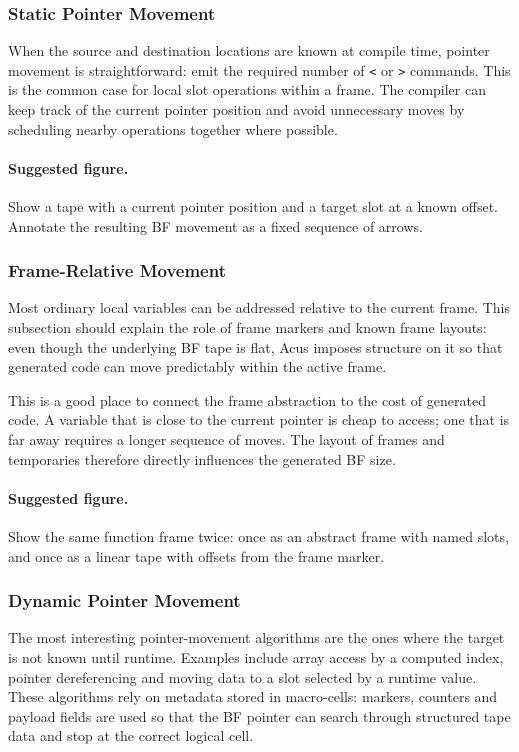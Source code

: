 \subsubsection{Static Pointer Movement}
When the source and destination locations are known at compile time, pointer movement is straightforward: emit the required number of \texttt{<} or \texttt{>} commands. This is the common case for local slot operations within a frame. The compiler can keep track of the current pointer position and avoid unnecessary moves by scheduling nearby operations together where possible.

\paragraph{Suggested figure.}
Show a tape with a current pointer position and a target slot at a known offset. Annotate the resulting BF movement as a fixed sequence of arrows.

\subsubsection{Frame-Relative Movement}
Most ordinary local variables can be addressed relative to the current frame. This subsection should explain the role of frame markers and known frame layouts: even though the underlying BF tape is flat, Acus imposes structure on it so that generated code can move predictably within the active frame.

This is a good place to connect the frame abstraction to the cost of generated code. A variable that is close to the current pointer is cheap to access; one that is far away requires a longer sequence of moves. The layout of frames and temporaries therefore directly influences the generated BF size.

\paragraph{Suggested figure.}
Show the same function frame twice: once as an abstract frame with named slots, and once as a linear tape with offsets from the frame marker.

\subsubsection{Dynamic Pointer Movement}
The most interesting pointer-movement algorithms are the ones where the target is not known until runtime. Examples include array access by a computed index, pointer dereferencing and moving data to a slot selected by a runtime value. These algorithms rely on metadata stored in macro-cells: markers, counters and payload fields are used so that the BF pointer can search through structured tape data and stop at the correct logical cell.

